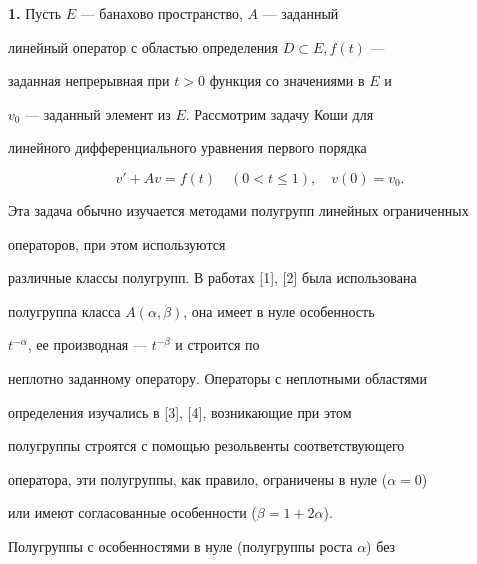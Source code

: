\date{}




\pagestyle{plain} %







\maketitle


\label{begin}











{\bf 1.} Пусть $E$ --- банахово пространство, $A$ --- заданный


линейный оператор с областью определения $D\subset E, f(t)$ ---


заданная непрерывная при $t> 0$ функция со значениями в $E$ и


$v_{0}$ --- заданный элемент из $E$. Рассмотрим задачу Коши для


линейного дифференциального уравнения первого порядка


$$


v'+Av=f(t) \quad (0<t\leq 1), \quad v(0)=v_{0}.


$$


Эта задача обычно изучается методами полугрупп линейных ограниченных


операторов,  при этом используются


различные классы полугрупп. В работах [1], [2] была использована


полугруппа класса $A(\alpha,\beta)$, она имеет в нуле особенность


$t^{-\alpha}$, ее производная --- $t^{-\beta}$ и строится по


неплотно заданному оператору. Операторы с неплотными областями


определения изучались в [3], [4], возникающие при этом


полугруппы строятся с помощью резольвенты соответствующего


оператора, эти полугруппы, как правило, ограничены в нуле ($\alpha=0$)


или имеют согласованные особенности ($\beta=1+2\alpha$).


Полугруппы с особенностями в нуле (полугруппы роста $\alpha$) без



